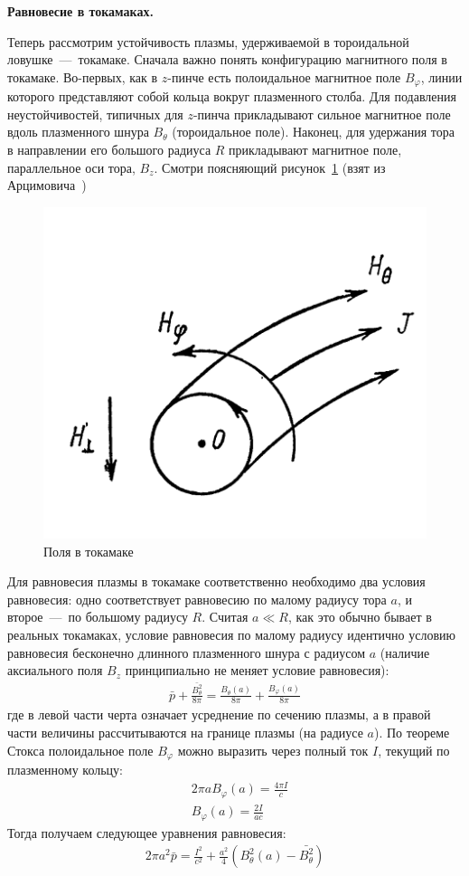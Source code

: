 \documentclass[10pt, a4paper]{article}
\begin{document}
\vspace{5mm}
\textbf{Равновесие в токамаках.}

Теперь рассмотрим устойчивость плазмы, удерживаемой в тороидальной ловушке~---~токамаке. 
Сначала важно понять конфигурацию магнитного поля в токамаке. Во-первых, как в $z$-пинче есть полоидальное магнитное поле $B_\varphi$, линии которого представляют собой кольца вокруг плазменного столба. Для подавления неустойчивостей, типичных для $z$-пинча прикладывают сильное магнитное поле вдоль плазменного шнура $B_\theta$ (тороидальное поле). Наконец, для удержания тора в направлении его большого радиуса $R$ прикладывают магнитное поле, параллельное оси тора, $B_z$. Смотри поясняющий рисунок~\ref{fig.6.tokamak_fields} (взят из Арцимовича~\cite{arzimovich})

\begin{figure}[ht]
	\begin{center}
		\includegraphics[width=0.5\linewidth]{6.tokamak_fields.png}
	\end{center}
    \caption{Поля в токамаке}
    \label{fig.6.tokamak_fields} 
\end{figure}

Для равновесия плазмы в токамаке соответственно необходимо два условия равновесия: одно соответствует равновесию по малому радиусу тора $a$, и второе~---~по большому радиусу $R$. Считая $a\ll R$, как это обычно бывает в реальных токамаках, условие равновесия по малому радиусу идентично условию равновесия бесконечно длинного плазменного шнура с радиусом $a$ (наличие аксиального поля $B_z$ принципиально не меняет условие равновесия):
\begin{align*}
   \bar{p} + \frac{\bar{B_\theta^2}}{8\pi} = \frac{B_\theta(a)}{8\pi} + \frac{B_\varphi(a)}{8\pi}
\end{align*}
где в левой части черта означает усреднение по сечению плазмы, а в правой части величины рассчитываются на границе плазмы (на радиусе $a$). По теореме Стокса полоидальное поле $B_\varphi$ можно выразить через полный ток $I$, текущий по плазменному кольцу:
\begin{align*}
   &2\pi a B_\varphi(a) = \frac{4\pi I}{c} \\
   &B_\varphi(a) = \frac{2I}{ac}
\end{align*}
Тогда получаем следующее уравнения равновесия:
\begin{align*}
   2\pi a^2\bar{p} = \frac{I^2}{c^2} + \frac{a^2}{4}\left( B_\theta^2(a) - \bar{B_\theta^2} \right)
\end{align*}
\end{document}
